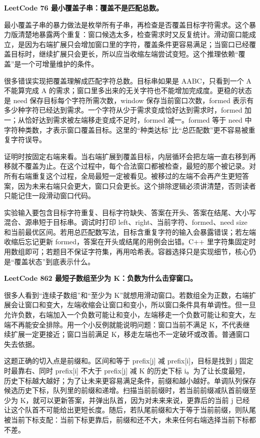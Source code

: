 \noindent\textbf{LeetCode 76 最小覆盖子串：覆盖不是匹配总数。}

最小覆盖子串的暴力做法是枚举所有子串，再检查是否覆盖目标字符需求。这个暴力版清楚地暴露两个重复：窗口候选太多，检查需求时又反复统计。滑动窗口能成立，是因为右端扩展只会增加窗口里的字符，覆盖条件更容易满足；当窗口已经覆盖目标时，继续扩展只会更长，所以应当收缩左端尝试变短。这个推理依赖“覆盖”是一个可增量维护的条件。

很多错误实现把覆盖理解成匹配字符总数。目标串如果是 AABC，只看到一个 A 不能算完成 A 的需求；窗口里多出来的无关字符也不能增加完成度。更稳的状态是 need 保存目标每个字符所需次数，window 保存当前窗口次数，formed 表示有多少种字符已经达到需求。一个字符从少于需求变成恰好达到需求时，formed 加一；从恰好达到需求被左端移走变成不足时，formed 减一。formed 等于 need 中字符种类数，才表示窗口覆盖目标。这里的“种类达标”比“总匹配数”更不容易被重复字符误导。

证明时按固定右端来看。当右端扩展到覆盖目标，内层循环会把左端一直右移到再移就不覆盖为止。在这个过程中，每个合法窗口都被检查，最短的那个被记录。对所有右端重复这个过程，全局最短一定被看见。被移过的左端不会再产生更短答案，因为未来右端只会更大，窗口只会更长。这个排除逻辑必须讲清楚，否则读者只能记住一段滑动窗口代码。

实验输入要包含目标字符重复、目标字符缺失、答案在开头、答案在结尾、大小写混合、源串短于目标串。调试时打印 left、right、当前字符、formed、need size 和当前最优区间。若用总匹配数写法，目标含重复字符的输入会暴露错误；若左端收缩后忘记更新 formed，答案在开头或结尾的用例会出错。C++ 里字符集固定时用数组即可；若题目不保证字符集，再用哈希表。容器选择只是实现细节，核心仍是“覆盖状态”到底表示什么。

\noindent\textbf{LeetCode 862 最短子数组至少为 K：负数为什么击穿窗口。}

很多人看到“连续子数组”和“至少为 K”就想用滑动窗口。若数组全为正数，右端扩展会让窗口和变大，左端收缩会让窗口和变小，所以窗口条件具有单调性。但一旦允许负数，右端加入一个负数可能让和变小，左端移走一个负数可能让和变大，左端不再能安全排除。用一个小反例就能说明问题：窗口当前不满足 K，不代表继续扩展一定更接近；窗口当前满足 K，移走左端也不一定破坏或改善。普通窗口失去依据。

这题正确的切入点是前缀和。区间和等于 prefix[j] 减 prefix[i]，目标是找到 j 固定时最靠右、同时 prefix[i] 不大于 prefix[j] 减 K 的历史下标 i。为了让长度最短，历史下标越大越好；为了让未来更容易满足条件，前缀和越小越好。单调队列保存候选历史下标，队列里的前缀和递增。扫描当前前缀时，若当前前缀减队首前缀至少为 K，就可以更新答案，并弹出队首，因为对未来来说，更靠后的当前 j 已经让这个队首不可能给出更短长度。随后，若队尾前缀和大于等于当前前缀，则队尾被当前下标支配：当前下标更靠后，前缀和还不大，未来任何右端选择当前下标都不差。

